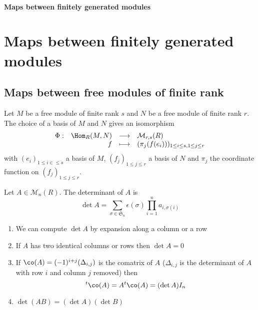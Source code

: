 \ifsolo
    ~

    \vspace{1cm}

    \begin{center}
        \textbf{\LARGE Maps between finitely generated modules} \\[1em]
    \end{center}

    \vspace{1cm}

    \tableofcontents

    \vspace{1cm}

\else
    \chapter{Maps between finitely generated modules}

    \minitoc
\fi
\thispagestyle{empty}

\section{Maps between free modules of finite rank}

\begin{thm}
Let $M$ be a free module of finite rank  $s$ and  $N$ be a free module of finite rank  $r$. The choice of a basis of  $M$ and  $N$ gives an isomorphism  \[
\begin{array}{rrcl}
    \Phi:& \Hom_R(M,N) & \longrightarrow & \mathcal M_{r,s}(R) \\
    & f & \longmapsto & \displaystyle (\pi_j(f(e_i)))_{1\leq i\leq s,1\leq j\leq r}
\end{array}
\] 
with $(e_i)_{1\leq i \in  \leq s}$ a basis of $M$, $(f_j)_{1\leq j\leq r}$ a basis of $N$ and $\pi_j$ the coordinate function on  $(f_j)_{1\leq j\leq r}$.
\end{thm}

\begin{dfn}
    Let $A \in  \mathcal  M_n(R)$. The determinant of $A$ is \[
\det A = \sum_{\sigma \in  \mathfrak S_n} \epsilon(\sigma)\prod_{i=1}^{n}  a_{i,\sigma(i)}
\] 
\end{dfn}

\begin{prop}[As expected...]
\begin{enumerate}
    \item We can compute $\det A$ by expansion along a column or a row
    \item  If $A$ has two identical columns or rows then  $\det A=0$
    \item If $\co(A)=(-1)^{i+j}(\Delta_{i,j})$ is the comatrix of  $A$ ($\Delta_{i,j}$ is the determinant of $A$ with row  $i$ and column  $j$ removed) then \[
    \transpose \co(A) = A \transpose \co (A) = (\det A)I_n
    \] 
    \item $\det(AB)=(\det A)(\det B)$\footnotemark
\end{enumerate}
\end{prop}


